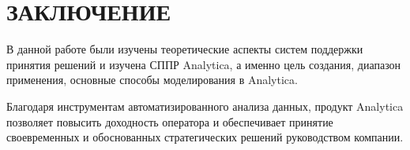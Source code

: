 \section*{ЗАКЛЮЧЕНИЕ}

В данной работе были изучены теоретические аспекты систем поддержки принятия
решений и изучена СППР Analytica, а именно цель создания, диапазон применения,
основные способы моделирования в Analytica.

Благодаря инструментам автоматизированного анализа данных, продукт Analytica
позволяет повысить доходность оператора и обеспечивает принятие своевременных
и обоснованных стратегических решений руководством компании.

\pagebreak